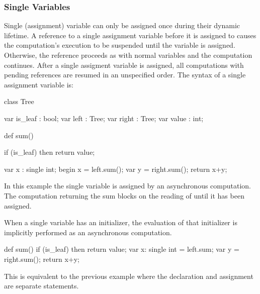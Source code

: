 \subsubsection{Single Variables}
\label{Single_Variables}

Single (assignment) variable can only be assigned once during their
dynamic lifetime.  A reference to a single assignment variable before
it is assigned to causes the computation's execution to be suspended
until the variable is assigned. Otherwise, the reference proceeds as
with normal variables and the computation continues.  After a single
assigment variable is assigned, all computations with pending
references are resumed in an unspecified order. The syntax of a single
assignment variable is:
\begin{chapel}
\end{chapel}

\begin{example}
\begin{chapel}
class Tree {
  var is_leaf : bool;
  var left    : Tree;
  var right   : Tree;
  var value   : int;

  def sum() {
    if (is_leaf) then 
       return value;

    var x : single int;
    begin x = left.sum();
    var y = right.sum();
    return x+y;
  }
}

\end{chapel}
In this example the single variable  is assigned by an
asynchronous computation. The computation returning the sum blocks
on the reading of  until it has been assigned.


\end{example}

When a single variable has an initializer, the evaluation of
that initializer is implicitly performed as an asynchronous computation. 
\begin{example}
\begin{chapel}
def sum() {
  if (is_leaf) then 
     return value;
  var x: single int = left.sum;
  var y = right.sum();
  return x+y;
}
\end{chapel}
This is equivalent to the previous example where the declaration and
assignment are separate statements.
\end{example}

